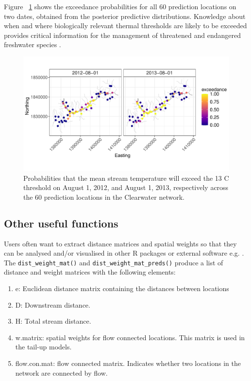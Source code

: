 Figure ~\ref{figure:exc} shows the exceedance probabilities for all 60 prediction locations on two dates, obtained from the posterior predictive distributions. Knowledge about when and where biologically relevant thermal thresholds are likely to be exceeded provides critical information for the management of threatened and endangered freshwater species \citep{isaak2016slow}.   


\begin{figure}[htbp]
  \centering
   \includegraphics[width=6.0in]{./Figs_Pay/exc.pdf}
  \caption{
  Probabilities that the mean stream temperature will exceed the 13 \textdegree{}C threshold on August 1, 2012, and August 1, 2013, respectively across the 60 prediction locations in the Clearwater network.
  }
  \label{figure:exc}
\end{figure}




\subsection*{Other useful functions}
Users often want to extract distance matrices and spatial weights so that they can be analysed and/or visualised in other R packages or external software e.g. \citet{McGuire14}. The \texttt{dist\_weight\_mat()} and \texttt{dist\_weight\_mat\_preds()} produce a list of distance and weight matrices with the following elements:

\begin{enumerate}
    \item e: Euclidean distance matrix containing the distances between locations
    \item D: Downstream distance.
    \item H: Total stream distance.
    \item w.matrix: spatial weights for flow connected locations. This matrix is used in the tail-up models. 
    \item flow.con.mat: flow connected matrix. Indicates whether two locations in the network are connected by flow.
\end{enumerate}

